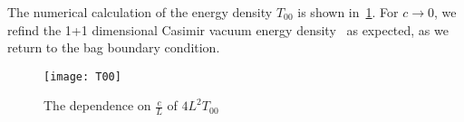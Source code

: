 The numerical calculation of the energy density $T_{00}$ is shown in~\cref{plotex1d}.
For $c \rightarrow 0$, we refind the 1+1 dimensional Casimir vacuum energy density~\cite{Sundberg2003} as expected, as we return to the bag boundary condition.
%
\begin{figure}[!h]
  \centering
  \texttt{[image: T00]}
  \caption{The dependence on $\frac{c}{L}$ of $4L^2T_{00}$}\label{plotex1d}
\end{figure}






